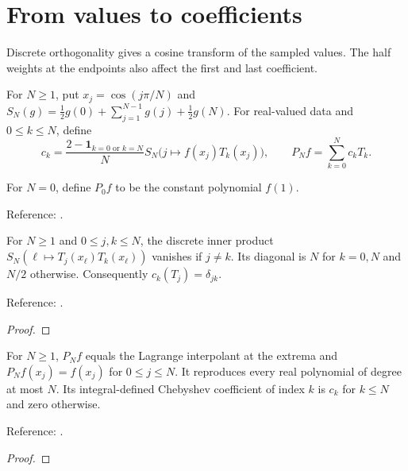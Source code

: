 \section{From values to coefficients}\label{sec:textbook-interpolation-dct}

Discrete orthogonality gives a cosine transform of the sampled values. The half weights at the endpoints also affect the first and last coefficient.

\begin{definition}
\label{def:extrema-dct}
\leanok
For $N\ge1$, put $x_j=\cos(j\pi/N)$ and
$S_N(g)=\tfrac12g(0)+\sum_{j=1}^{N-1}g(j)+\tfrac12g(N)$.
For real-valued data and $0\le k\le N$, define
\[
 c_k=\frac{2-\mathbf1_{k=0\text{ or }k=N}}{N}
 S_N\bigl(j\mapsto f(x_j)T_k(x_j)\bigr),\qquad
 P_Nf=\sum_{k=0}^N c_kT_k.
\]

For $N=0$, define $P_0f$ to be the constant polynomial $f(1)$.

Reference: \cite[Chapters 4 and 6]{atap}.
\end{definition}

\begin{theorem}
\label{thm:discrete-T-orthogonal}
\leanok
For $N\ge1$ and $0\le j,k\le N$, the discrete inner product
$S_N(\ell\mapsto T_j(x_\ell)T_k(x_\ell))$ vanishes if $j\ne k$.
Its diagonal is $N$ for $k=0,N$ and $N/2$ otherwise.
Consequently $c_k(T_j)=\delta_{jk}$.

Reference: \cite[Chapter 4]{atap}.
\end{theorem}
\begin{proof}
\leanok
\end{proof}

\begin{theorem}
\label{thm:dct-reconstruction}
\leanok
For $N\ge1$, $P_Nf$ equals the Lagrange interpolant at the extrema and
$P_Nf(x_j)=f(x_j)$ for $0\le j\le N$. It reproduces every real polynomial
of degree at most $N$. Its integral-defined Chebyshev coefficient of index $k$
is $c_k$ for $k\le N$ and zero otherwise.

Reference: \cite[Chapters 4 and 6]{atap}.
\end{theorem}
\begin{proof}
\leanok
\end{proof}

